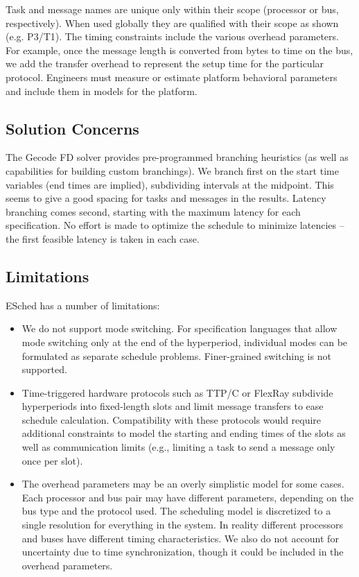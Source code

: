 Task and message names are unique only within their scope (processor or bus, respectively).  When used globally they are qualified with their scope as shown (e.g. P3/T1). The timing constraints include the various overhead parameters.  For example, once the message length is converted from bytes to time on the bus, we add the transfer overhead to represent the setup time for the particular protocol.  Engineers must measure or estimate platform behavioral parameters and include them in models for the platform.

\subsection{Solution Concerns}

The Gecode FD solver provides pre-programmed branching heuristics (as well as capabilities for building custom branchings).  We branch first on the start time variables (end times are implied), subdividing intervals at the midpoint.  This seems to give a good spacing for tasks and messages in the results.  Latency branching comes second, starting with the maximum latency for each specification.  No effort is made to optimize the schedule to minimize latencies -- the first feasible latency is taken in each case.  

\subsection{Limitations}

ESched has a number of limitations:

\begin{itemize}
\item We do not support mode switching.  For specification languages that allow mode switching only at the end of the hyperperiod, individual modes can be formulated as separate schedule problems.  Finer-grained switching is not supported.
\item Time-triggered hardware protocols such as TTP/C or FlexRay subdivide hyperperiods into fixed-length slots and limit message transfers to ease schedule calculation.  Compatibility with these protocols would require additional constraints to model the starting and ending times of the slots as well as communication limits (e.g., limiting a task to send a message only once per slot).
\item The overhead parameters may be an overly simplistic model for some cases.  Each processor and bus pair may have different parameters, depending on the bus type and the protocol used.
The scheduling model is discretized to a single resolution for everything in the system.  In reality different processors and buses have different timing characteristics.  We also do not account for uncertainty due to time synchronization, though it could be included in the overhead parameters.
\end{itemize}
